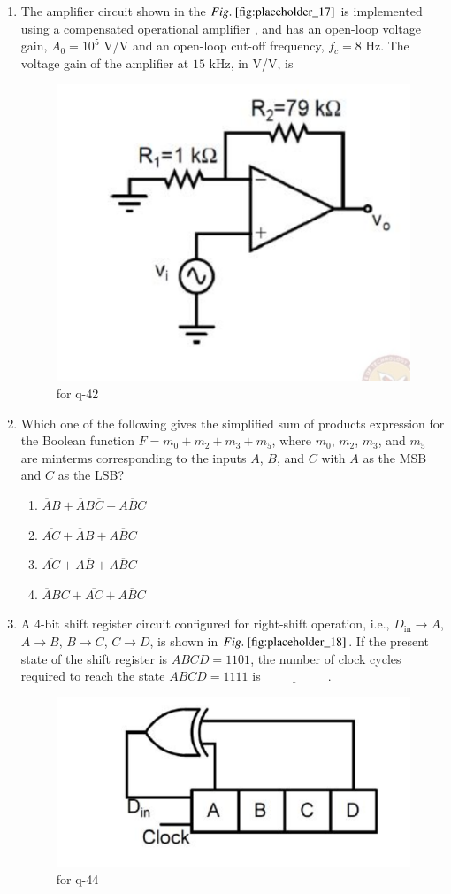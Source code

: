 \documentclass[journal,12pt,onecolumn]{IEEEtran}
\theoremstyle{remark}
\begin{document}
\begin{enumerate}
\item The amplifier circuit shown in the $\figref{fig:placeholder_17}$ is implemented using a compensated operational amplifier , and has an open-loop voltage gain, $A_0 = 10^5$ V/V and an open-loop cut-off frequency, $f_c = 8$ Hz. The voltage gain of the amplifier at $15$ kHz, in V/V, is
\begin{figure}[H]
    \centering
    \includegraphics[width=0.3\columnwidth]{figs/17.png}
    \caption{\centering for q-42}
    \label{fig:placeholder_17}
\end{figure}
\hfill {}

\item Which one of the following gives the simplified sum of products expression for the Boolean function $F = m_0 + m_2 + m_3 + m_5$, where $m_0$, $m_2$, $m_3$, and $m_5$ are minterms corresponding to the inputs $A$, $B$, and $C$ with $A$ as the MSB and $C$ as the LSB?
\begin{multicols}{2}
\begin{enumerate}
\item $\overline{A}B + \overline{A}B\overline{C} + A\overline{B}C$
\item $\overline{AC} + \overline{A}B + A\overline{B}C$
\item $\overline{AC} + A\overline{B} + A\overline{B}C$
\item $\overline{A}BC + \overline{AC} + A\overline{B}C$
\end{enumerate}
\end{multicols}
\hfill {}

\item A 4-bit shift register circuit configured for right-shift operation, i.e., $D_{\text{in}} \rightarrow A$, $A \rightarrow B$, $B \rightarrow C$, $C \rightarrow D$, is shown in $\figref{fig:placeholder_18}$. If the present state of the shift register is $ABCD = 1101$, the number of clock cycles required to reach the state $ABCD = 1111$ is $\underline{\hspace{2cm}}$ .
\begin{figure}[H]
    \centering
    \includegraphics[width=0.3\columnwidth]{figs/18.png}
    \caption{\centering for q-44}
    \label{fig:placeholder_18}
\end{figure}


\end{enumerate}
\end{document}
